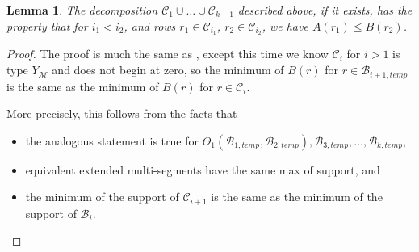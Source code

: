 \documentclass[11pt,letterpaper]{amsart}
\newcommand{\BB}{\mathcal{B}}
\newcommand{\CC}{\mathcal{C}}
\newtheorem{lemma}[thm]{Lemma}
\numberwithin{equation}{section}
\begin{document}
\begin{lemma}
\label{lem-staircase-theta-lift}
    The decomposition $\CC_1 \cup \dots \cup \CC_{k-1}$ described above, if it exists, has the property that for $i_1 < i_2$, and rows $r_1 \in \CC_{i_1}$, $r_2 \in \CC_{i_2}$, we have $A(r_1) \leq B(r_2)$. 
\end{lemma}
\begin{proof}
    The proof is much the same as \cite[Lemma 7.4]{HKT26}, except this time we know $\CC_i$ for $i>1$ is type $Y_\mathcal{M}$ and does not begin at zero, so the minimum of $B(r)$ for $r \in \BB_{i+1, temp}$ is the same as the minimum of $B(r)$ for $r \in \CC_i$.
    
    More precisely, this follows from the facts that
    \begin{itemize}
        \item the analogous statement is true for $\Theta_1(\BB_{1, temp}, \BB_{2, temp}), \BB_{3, temp}, \dots, \BB_{k, temp}$,
        \item equivalent extended multi-segments have the same max of support, and
        \item the minimum of the support of $\CC_{i+1}$ is the same as the minimum of the support of $\BB_i$. \qedhere
    \end{itemize}
\end{proof}
\end{document}
